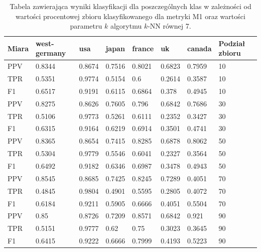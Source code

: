 \documentclass{classrep}
\begin{document}
\begin{table}[H]
    \centering
\caption{Tabela zawierająca wyniki klasyfikacji dla poszczególnych klas w zależności od wartości procentowej zbioru
klasyfikowanego dla metryki M1 oraz wartości parametru $k$ algorytmu $k$-NN równej 7.}
\begin{adjustbox}{max width=\textwidth}
    \begin{tabular}{|l|l|l|l|l|l|l|l|}
    \hline
        Miara & west-germany  & usa  & japan & france & uk & canada & Podział zbioru \\ \hline
        PPV & 0.8344 & 0.8674 & 0.7516 & 0.8021 & 0.6823 & 0.7959 & 10 \\ \hline
        TPR & 0.5351 & 0.9774 & 0.5154 & 0.6 & 0.2614 & 0.3587 & 10 \\ \hline
        F1 & 0.6517 & 0.9191 & 0.6115 & 0.6864 & 0.378 & 0.4945 & 10 \\ \hline
        PPV & 0.8275 & 0.8626 & 0.7605 & 0.796 & 0.6842 & 0.7686 & 30 \\ \hline
        TPR & 0.5106 & 0.9773 & 0.5261 & 0.6111 & 0.2352 & 0.3427 & 30 \\ \hline
        F1 & 0.6315 & 0.9164 & 0.6219 & 0.6914 & 0.3501 & 0.4741 & 30 \\ \hline
        PPV & 0.8365 & 0.8654 & 0.7415 & 0.8285 & 0.6878 & 0.8062 & 50 \\ \hline
        TPR & 0.5304 & 0.9779 & 0.5546 & 0.6041 & 0.2327 & 0.3564 & 50 \\ \hline
        F1 & 0.6492 & 0.9182 & 0.6346 & 0.6987 & 0.3478 & 0.4943 & 50 \\ \hline
        PPV & 0.8545 & 0.8685 & 0.7425 & 0.8245 & 0.7289 & 0.4051 & 70 \\ \hline
        TPR & 0.4845 & 0.9804 & 0.4901 & 0.5595 & 0.2805 & 0.4072 & 70 \\ \hline
        F1 & 0.6184 & 0.9211 & 0.5905 & 0.6666 & 0.4051 & 0.5504 & 70 \\ \hline
        PPV & 0.85 & 0.8726 & 0.7209 & 0.8571 & 0.6842 & 0.921 & 90 \\ \hline
        TPR & 0.5151 & 0.9777 & 0.62 & 0.75 & 0.3023 & 0.3645 & 90 \\ \hline
        F1 & 0.6415 & 0.9222 & 0.6666 & 0.7999 & 0.4193 & 0.5223 & 90 \\ \hline
    \end{tabular}
\end{adjustbox}
\end{table}
\end{document}
